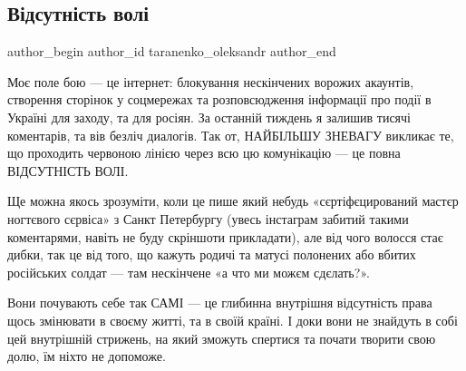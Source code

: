 
 
 
 
 
 
\subsection{Відсутність волі}
\label{sec:05_03_2022.fb.taranenko_oleksandr.1.vidsutnist_voli}
 
\ifcmt
 author_begin
   author_id taranenko_oleksandr
 author_end
\fi

Моє поле бою — це інтернет: блокування нескінчених ворожих акаунтів, створення
сторінок у соцмережах та розповсюдження інформації про події в Україні для
заходу, та для росіян. За останній тиждень я залишив тисячі коментарів, та вів
безліч диалогів. Так от, НАЙБІЛЬШУ ЗНЕВАГУ викликає те, що проходить червоною
лінією через всю цю комунікацію — це повна ВІДСУТНІСТЬ ВОЛІ. 


Ще можна якось зрозуміти, коли це пише який небудь «сєртіфєцирований мастєр
ногтєвого сєрвіса» з Санкт Петербургу (увесь інстаграм забитий такими
коментарями, навіть не буду скріншоти прикладати), але від чого волосся стає
дибки, так це від того, що кажуть родичі та матусі полонених або вбитих
російських солдат — там нескінчене «а что ми можєм сдєлать?». 


Вони почувають себе так САМІ — це глибинна внутрішня відсутність права щось
змінювати в своєму житті, та в своїй країні. І доки вони не знайдуть в собі цей
внутрішній стрижень, на який зможуть спертися та почати творити свою долю, їм
ніхто не допоможе.

